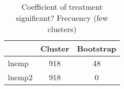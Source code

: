 \begin{table}[htbp]\centering
\caption{Coefficient of treatment significant? Frecuency (few clusters)}
\begin{tabular}{l*{2}{c}}
\toprule
            &     Cluster&   Bootstrap\\
\midrule
lnemp       &         918&          48\\
lnemp2      &         918&           0\\
\bottomrule
\end{tabular}
\end{table}
